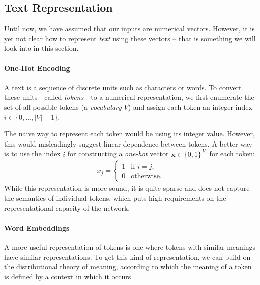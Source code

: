 {\subsection{Text Representation}
\label{sec:text-repr}

Until now, we have assumed that our inputs are numerical vectors. However, it is yet not clear how to represent \emph{text} using these vectors -- that is something we will look into in this section.

\paragraph{One-Hot Encoding}
A text is a sequence of discrete units such as characters or words. To convert these units---called \textit{tokens}---to a numerical representation, we first enumerate the set of all possible tokens (a \textit{vocabulary} $V$) and assign each token an integer index $i \in \{0, \ldots, |V|-1\}$.

The naive way to represent each token would be using its integer value. However, this would misleadingly suggest linear dependence between tokens. A better way is to use the index $i$ for constructing a \textit{one-hot} vector $\mathbf{x} \in \{0,1\}^{|V|} $ for each token:
\begin{align}
    x_j = \begin{cases}
        1 & \text{if } i = j, \\
        0 & \text{otherwise}.
    \end{cases}
\end{align}
While this representation is more sound, it is quite sparse and does not capture the semantics of individual tokens, which puts high requirements on the representational capacity of the network.

\paragraph{Word Embeddings} A more useful representation of tokens is one where tokens with similar meanings have similar representations. To get this kind of representation, we can build on the distributional theory of meaning, according to which the meaning of a token is defined by a context in which it occurs \cite{harris1954distributional,firth1957synopsis}.

}
